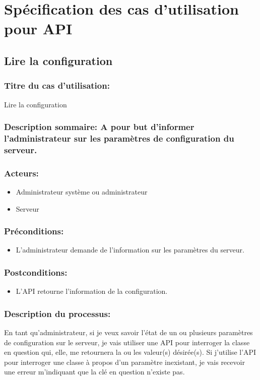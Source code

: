 \documentclass{scrreprt}
\begin{document}
\section{Spécification des cas d'utilisation pour API}
\subsection{Lire la configuration}
\subsubsection{Titre du cas d'utilisation:} Lire la configuration
\subsubsection{Description sommaire: A pour but d'informer l'administrateur sur les paramètres de  configuration du serveur.}
\subsubsection{Acteurs:}
\begin{itemize}
	\item Administrateur système ou administrateur
    \item Serveur
\end{itemize}
\subsubsection{Préconditions:}
\begin{itemize}
    \item L'administrateur demande de l'information sur les paramètres du serveur.
\end{itemize} 
\subsubsection{Postconditions:}
\begin{itemize}
    \item  L'API retourne l'information de la configuration.    
\end{itemize} 
\subsubsection{Description du processus:}En tant qu'administrateur, si je veux savoir l'état de un ou plusieurs paramètres de
configuration sur le serveur, je vais utiliser une API pour interroger la
classe en question qui, elle, me retournera la ou les valeur(s) désirée(s).
Si j'utilise l'API pour interroger une classe à propos d'un paramètre
inexistant, je vais recevoir une erreur m'indiquant que la clé en question
n'existe pas.
\end{document}
